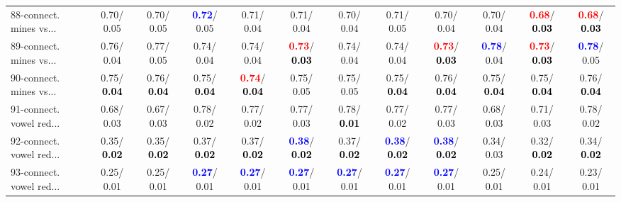 \begin{table}[h]
\begin{center}
{\begin{tabular}{lc|c|c|c|c|c|c|c|c|c|c}
88-connect. mines vs... &   0.70/  0.05 &   0.70/  0.05 & \textcolor{blue}{\textbf{  0.72}}/  0.05 &   0.71/  0.04 &   0.71/  0.04 &   0.70/  0.04 &   0.71/  0.05 &   0.70/  0.04 &   0.70/  0.04 & \textcolor{red}{\textbf{  0.68}}/\textcolor{black}{\textbf{  0.03}} & \textcolor{red}{\textbf{  0.68}}/\textcolor{black}{\textbf{  0.03}} \\
89-connect. mines vs... &   0.76/  0.04 &   0.77/  0.05 &   0.74/  0.04 &   0.74/  0.04 & \textcolor{red}{\textbf{  0.73}}/\textcolor{black}{\textbf{  0.03}} &   0.74/  0.04 &   0.74/  0.04 & \textcolor{red}{\textbf{  0.73}}/\textcolor{black}{\textbf{  0.03}} & \textcolor{blue}{\textbf{  0.78}}/  0.04 & \textcolor{red}{\textbf{  0.73}}/\textcolor{black}{\textbf{  0.03}} & \textcolor{blue}{\textbf{  0.78}}/  0.05 \\
90-connect. mines vs... &   0.75/\textcolor{black}{\textbf{  0.04}} &   0.76/\textcolor{black}{\textbf{  0.04}} &   0.75/\textcolor{black}{\textbf{  0.04}} & \textcolor{red}{\textbf{  0.74}}/\textcolor{black}{\textbf{  0.04}} &   0.75/  0.05 &   0.75/  0.05 &   0.75/\textcolor{black}{\textbf{  0.04}} &   0.76/\textcolor{black}{\textbf{  0.04}} &   0.75/\textcolor{black}{\textbf{  0.04}} &   0.75/\textcolor{black}{\textbf{  0.04}} &   0.76/\textcolor{black}{\textbf{  0.04}} \\
91-connect. vowel red... &   0.68/  0.03 &   0.67/  0.03 &   0.78/  0.02 &   0.77/  0.02 &   0.77/  0.03 &   0.78/\textcolor{black}{\textbf{  0.01}} &   0.77/  0.02 &   0.77/  0.03 &   0.68/  0.03 &   0.71/  0.03 &   0.78/  0.02 \\
92-connect. vowel red... &   0.35/\textcolor{black}{\textbf{  0.02}} &   0.35/\textcolor{black}{\textbf{  0.02}} &   0.37/\textcolor{black}{\textbf{  0.02}} &   0.37/\textcolor{black}{\textbf{  0.02}} & \textcolor{blue}{\textbf{  0.38}}/\textcolor{black}{\textbf{  0.02}} &   0.37/\textcolor{black}{\textbf{  0.02}} & \textcolor{blue}{\textbf{  0.38}}/\textcolor{black}{\textbf{  0.02}} & \textcolor{blue}{\textbf{  0.38}}/\textcolor{black}{\textbf{  0.02}} &   0.34/  0.03 &   0.32/\textcolor{black}{\textbf{  0.02}} &   0.34/\textcolor{black}{\textbf{  0.02}} \\ \hline
93-connect. vowel red... &   0.25/  0.01 &   0.25/  0.01 & \textcolor{blue}{\textbf{  0.27}}/  0.01 & \textcolor{blue}{\textbf{  0.27}}/  0.01 & \textcolor{blue}{\textbf{  0.27}}/  0.01 & \textcolor{blue}{\textbf{  0.27}}/  0.01 & \textcolor{blue}{\textbf{  0.27}}/  0.01 & \textcolor{blue}{\textbf{  0.27}}/  0.01 &   0.25/  0.01 &   0.24/  0.01 &   0.23/  0.01 \\

\end{tabular}}
\end{center}
\end{table}
